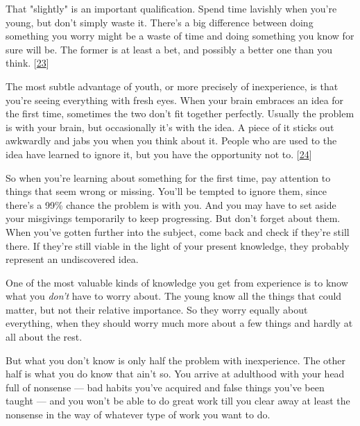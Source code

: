 That "slightly" is an important
                  qualification. Spend time lavishly when you're young, but
                  don't simply waste it. There's a big difference between doing
                  something you worry might be a waste of time and doing
                  something you know for sure will be. The former is at least a
                  bet, and possibly a better one than you think.
                  [\href{\#f23n}{23}]

The most subtle advantage of youth, or more
                  precisely of inexperience, is that you're seeing everything
                  with fresh eyes. When your brain embraces an idea for the
                  first time, sometimes the two don't fit together perfectly.
                  Usually the problem is with your brain, but occasionally it's
                  with the idea. A piece of it sticks out awkwardly and jabs you
                  when you think about it. People who are used to the idea have
                  learned to ignore it, but you have the opportunity not to.
                  [\href{\#f24n}{24}]

So when you're learning about something for the
                  first time, pay attention to things that seem wrong or
                  missing. You'll be tempted to ignore them, since there's a 99\%
                  chance the problem is with you. And you may have to set aside
                  your misgivings temporarily to keep progressing. But don't
                  forget about them. When you've gotten further into the
                  subject, come back and check if they're still there. If
                  they're still viable in the light of your present knowledge,
                  they probably represent an undiscovered idea.






                  One of the most valuable kinds of knowledge you get from
                  experience is to know what you \emph{don't} have to worry
                  about. The young know all the things that could matter, but
                  not their relative importance. So they worry equally about
                  everything, when they should worry much more about a few
                  things and hardly at all about the rest.

But what
                  you don't know is only half the problem with inexperience. The
                  other half is what you do know that ain't so. You arrive at
                  adulthood with your head full of nonsense --- bad habits
                  you've acquired and false things you've been taught ---
                  and you won't be able to do great work till you clear away at
                  least the nonsense in the way of whatever type of work you
                  want to do.

